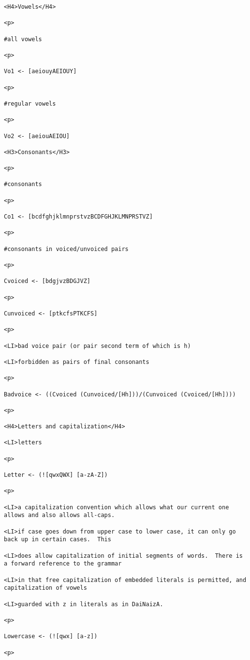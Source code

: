 \documentclass[12pt]{article}
\begin{document}
\begin{lstlisting}
<H4>Vowels</H4>

<p>

#all vowels

<p>

Vo1 <- [aeiouyAEIOUY]

<p>

#regular vowels

<p>

Vo2 <- [aeiouAEIOU]

<H3>Consonants</H3>

<p>

#consonants

<p>

Co1 <- [bcdfghjklmnprstvzBCDFGHJKLMNPRSTVZ]

<p>

#consonants in voiced/unvoiced pairs

<p>

Cvoiced <- [bdgjvzBDGJVZ]

<p>

Cunvoiced <- [ptkcfsPTKCFS]

<p>

<LI>bad voice pair (or pair second term of which is h)

<LI>forbidden as pairs of final consonants

<p>

Badvoice <- ((Cvoiced (Cunvoiced/[Hh]))/(Cunvoiced (Cvoiced/[Hh])))

<p>

<H4>Letters and capitalization</H4>

<LI>letters

<p>

Letter <- (![qwxQWX] [a-zA-Z])

<p>

<LI>a capitalization convention which allows what our current one allows and also allows all-caps.

<LI>if case goes down from upper case to lower case, it can only go back up in certain cases.  This

<LI>does allow capitalization of initial segments of words.  There is a forward reference to the grammar

<LI>in that free capitalization of embedded literals is permitted, and capitalization of vowels

<LI>guarded with z in literals as in DaiNaizA.

<p>

Lowercase <- (![qwx] [a-z])

<p>


\end{lstlisting}
\end{document}
